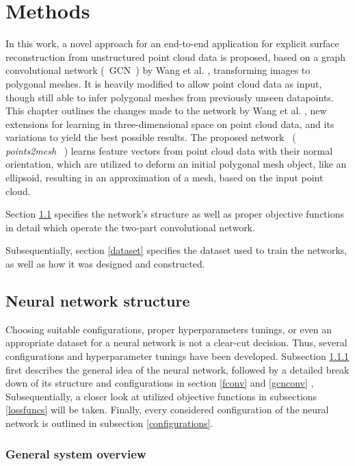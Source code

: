 \chapter{Methods}
\label{sec:methods}
In this work, a novel approach for an end-to-end application for explicit surface 
reconstruction from unstructured point cloud data is proposed, based on a graph convolutional network (~GCN~) by Wang et al. \cite{wang2018pixel2mesh}, transforming images 
to polygonal meshes. It is heavily modified to allow point cloud data as input, though still able to infer polygonal meshes from previously unseen datapoints. 
This chapter outlines the changes made to the network by Wang et al. , new extensions 
for learning in three-dimensional space on point cloud data, and its variations to
 yield the best possible results. 
The proposed network ~(~ \emph{points2mesh} ~) learns feature vectors from point cloud data with their
 normal orientation, which are utilized to deform an initial polygonal 
 mesh object, like an ellipsoid, resulting in an approximation of a mesh, based on the input point cloud.

Section \ref{networkconfig} specifies the network's structure as well as
 proper objective functions in detail which operate the two-part
  convolutional network.

Subsequentially, section \ref{dataset} specifies the dataset used to
 train the networks, as well as how it was designed and constructed.

\section{Neural network structure}
\label{networkconfig}
Choosing suitable configurations, proper hyperparameters tunings,
 or even an appropriate dataset for a neural network is not a clear-cut decision. 
 Thus, several configurations and hyperparameter tunings have been developed.
  Subsection \ref{generalsystem} first describes the general idea of the neural network, followed by a detailed
   break down of its structure and configurations in section \ref{fconv} and \ref{gcnconv} ,
   Subsequentially, a closer look at utilized objective functions in subsections \ref{lossfuncs} will be taken.
   Finally, every considered configuration of the neural network is outlined in subsection \ref{configurations}.
\subsection{General system overview}
\label{generalsystem}

